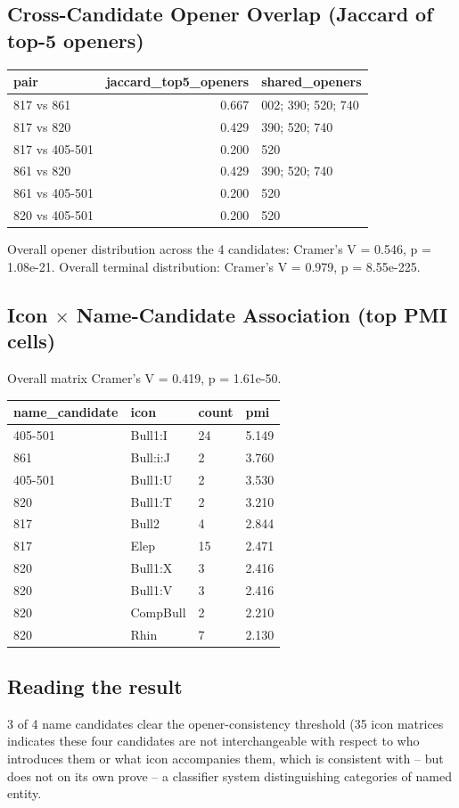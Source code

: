 \subsection{Cross-Candidate Opener Overlap (Jaccard of top-5 openers)}
\begin{tabular}{lrp{}}
\toprule
\textbf{pair} & \textbf{jaccard\_top5\_openers} & \textbf{shared\_openers} \\
\midrule
817 vs 861 & 0.667 & 002; 390; 520; 740 \\
817 vs 820 & 0.429 & 390; 520; 740 \\
817 vs 405-501 & 0.200 & 520 \\
861 vs 820 & 0.429 & 390; 520; 740 \\
861 vs 405-501 & 0.200 & 520 \\
820 vs 405-501 & 0.200 & 520 \\
\bottomrule
\end{tabular}

Overall opener distribution across the 4 candidates: Cramer's V = 0.546,
p = 1.08e-21. Overall terminal distribution: Cramer's V = 0.979,
p = 8.55e-225.

\subsection{Icon $\times$ Name-Candidate Association (top PMI cells)}
Overall matrix Cramer's V = 0.419, p = 1.61e-50.
\begin{tabular}{llll}
\toprule
\textbf{name\_candidate} & \textbf{icon} & \textbf{count} & \textbf{pmi} \\
\midrule
405-501 & Bull1:I & 24 & 5.149 \\
861 & Bull:i:J & 2 & 3.760 \\
405-501 & Bull1:U & 2 & 3.530 \\
820 & Bull1:T & 2 & 3.210 \\
817 & Bull2 & 4 & 2.844 \\
817 & Elep & 15 & 2.471 \\
820 & Bull1:X & 3 & 2.416 \\
820 & Bull1:V & 3 & 2.416 \\
820 & CompBull & 2 & 2.210 \\
820 & Rhin & 7 & 2.130 \\
\bottomrule
\end{tabular}

\subsection*{Reading the result}
3 of 4 name candidates clear the opener-consistency threshold (35%
icon matrices indicates these four candidates are not interchangeable with
respect to who introduces them or what icon accompanies them, which is
consistent with -- but does not on its own prove -- a classifier system
distinguishing categories of named entity.
